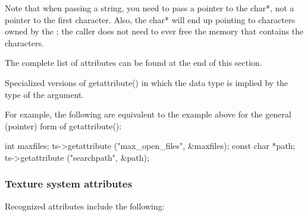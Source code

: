 Note that when passing a string, you need to pass a pointer to the {\cf
  char*}, not a pointer to the first character.  Also, the {\cf char*}
will end up pointing to characters owned by the \TextureSystem; the
caller does not need to ever free the memory that contains the
characters.

The complete list of attributes can be found at the end of this section.


\apiend

Specialized versions of {\cf getattribute()} in which the data type is
implied by the type of the argument.

For example, the following are equivalent to the example above for the
general (pointer) form of {\cf getattribute()}:

\begin{code}
      int maxfiles;
      ts->getattribute ("max_open_files", &maxfiles);
      const char *path;
      ts->getattribute ("searchpath", &path);
\end{code}

\apiend


\subsubsection*{Texture system attributes}
\label{sec:texturesys:attributes}

Recognized attributes include the following:



